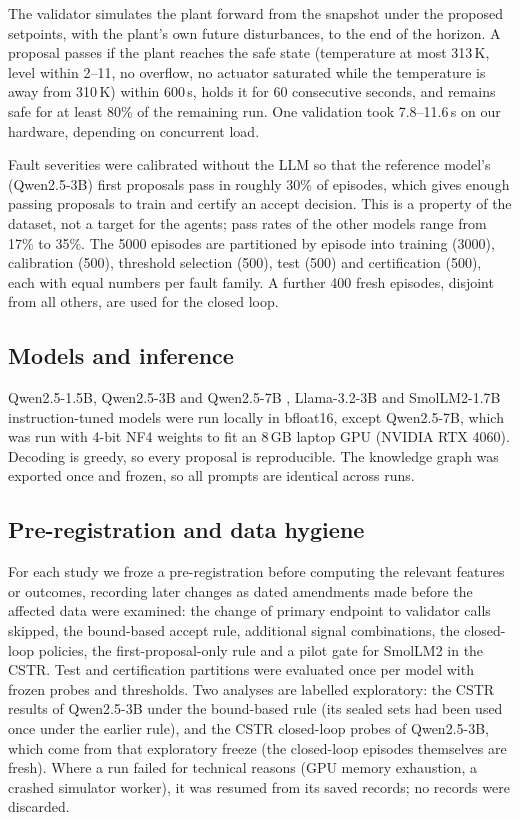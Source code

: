 The validator simulates the plant forward from the snapshot under the proposed setpoints, with the plant's own future
disturbances, to the end of the horizon. A proposal passes if the plant reaches the safe state (temperature at most
313\,K, level within 2--11, no overflow, no actuator saturated while the temperature is away from 310\,K) within
600\,s, holds it for 60 consecutive seconds, and remains safe for at least 80\% of the remaining run. One validation
took 7.8--11.6\,s on our hardware, depending on concurrent load.

Fault severities were calibrated without the LLM so that the reference model's (Qwen2.5-3B) first proposals pass in
roughly 30\% of episodes, which gives enough passing proposals to train and certify an accept decision. This is a
property of the dataset, not a target for the agents; pass rates of the other models range from 17\% to 35\%. The
5000 episodes are partitioned by episode into training (3000), calibration (500), threshold selection (500), test
(500) and certification (500), each with equal numbers per fault family. A further 400 fresh episodes, disjoint from
all others, are used for the closed loop.

\subsection{Models and inference}
Qwen2.5-1.5B, Qwen2.5-3B and Qwen2.5-7B \citep{qwen2025}, Llama-3.2-3B \citep{llama3} and SmolLM2-1.7B
\citep{allal2025smollm2} instruction-tuned models were run locally in bfloat16, except Qwen2.5-7B, which was run with
4-bit NF4 weights \citep{dettmers2023qlora} to fit an 8\,GB laptop GPU (NVIDIA RTX 4060). Decoding is greedy, so every
proposal is reproducible. The knowledge graph was exported once and frozen, so all prompts are identical across runs.

\subsection{Pre-registration and data hygiene}
For each study we froze a pre-registration before computing the relevant features or outcomes, recording later
changes as dated amendments made before the affected data were examined: the change of primary endpoint to validator
calls skipped, the bound-based accept rule, additional signal combinations, the closed-loop policies, the
first-proposal-only rule and a pilot gate for SmolLM2 in the CSTR. Test and certification partitions were evaluated
once per model with frozen probes and thresholds. Two analyses are labelled exploratory: the CSTR results of
Qwen2.5-3B under the bound-based rule (its sealed sets had been used once under the earlier rule), and the CSTR
closed-loop probes of Qwen2.5-3B, which come from that exploratory freeze (the closed-loop episodes themselves are
fresh). Where a run failed for technical reasons (GPU memory exhaustion, a crashed simulator worker), it was resumed
from its saved records; no records were discarded.


